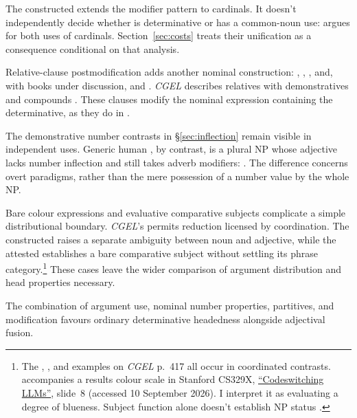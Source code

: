 \documentclass[12pt]{article}
\begin{document}
The constructed  extends the modifier pattern to cardinals. It doesn't independently decide whether  is determinative or has a common-noun use: \textcite{reynolds2026numerals} argues for both uses of cardinals. Section~\ref{sec:costs} treats their unification as a consequence conditional on that analysis.

Relative-clause postmodification adds another nominal construction: , , , and, with books under discussion,  and . \textit{CGEL} describes relatives with demonstratives and compounds \citep[414, 422--423]{huddleston2002}. These clauses modify the nominal expression containing the determinative, as they do in .

The demonstrative number contrasts in §\ref{sec:inflection} remain visible in independent uses. Generic human , by contrast, is a plural NP whose adjective lacks number inflection and still takes adverb modifiers:  \citep[418]{huddleston2002}. The difference concerns overt paradigms, rather than the mere possession of a number value by the whole NP.

Bare colour expressions and evaluative comparative subjects complicate a simple distributional boundary. \textit{CGEL}'s  permits reduction licensed by coordination. The constructed  raises a separate ambiguity between noun and adjective, while the attested  establishes a bare comparative subject without settling its phrase category.\footnote{The , , and  examples on \textit{CGEL} p.~417 all occur in coordinated contrasts.  accompanies a results colour scale in Stanford CS329X, \href{https://web.stanford.edu/class/cs329x/slides/Lecture12_B_Codeswitching\%20LLMs.pdf}{\enquote{Codeswitching LLMs}}, slide~8 (accessed 10 September 2026). I interpret it as evaluating a degree of blueness. Subject function alone doesn't establish NP status \citep[236]{huddleston2002}.} These cases leave the wider comparison of argument distribution and head properties necessary.

The combination of argument use, nominal number properties, partitives, and modification favours ordinary determinative headedness alongside adjectival fusion.
\end{document}
